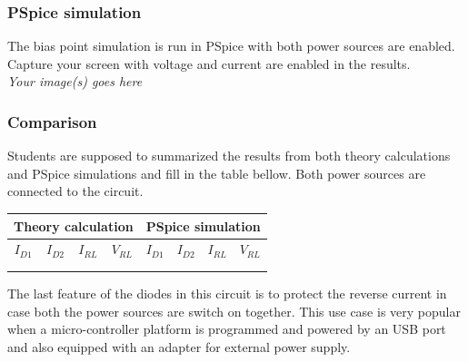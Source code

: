 \subsubsection{PSpice simulation}
The bias point simulation is run in PSpice with both power sources are enabled. Capture your screen with voltage and current are enabled in the results.\\

\textit{Your image(s) goes here}
\newpage
\vspace{8cm}

\subsubsection{Comparison}
Students are supposed to summarized the results from both theory calculations and PSpice simulations and fill in the table bellow. Both power sources are connected to the circuit.\\

\begin{center}
    \begin{tabular}{|l|l|l|l|l|l|l|l|}
\hline
\multicolumn{4}{|c|}{Theory calculation}                                                                                       & \multicolumn{4}{c|}{PSpice simulation}    \\ \hline
\multicolumn{1}{|c|}{$I_{D1}$} & \multicolumn{1}{c|}{$I_{D2}$} & \multicolumn{1}{c|}{$I_{RL}$} & \multicolumn{1}{c|}{$V_{RL}$} & $I_{D1}$ & $I_{D2}$ & $I_{RL}$ & $V_{RL}$ \\ \hline
                               &                               &                               &                               &          &          &          &          \\ \hline
                               &                               &                               &                               &          &          &          &          \\ \hline
\end{tabular}
\end{center}


The last feature of the diodes in this circuit is  to protect the reverse current in case both the power sources are switch on together. This use case is very popular when a micro-controller platform is programmed and powered by an USB port and also equipped with an adapter for external power supply.

